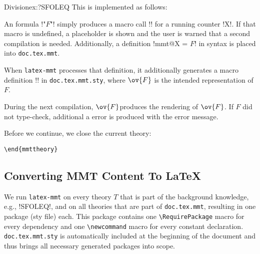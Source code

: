 \begin{mmttheory}{Division}{ex:?SFOLEQ}
\noindent
This is implemented as follows:
\begin{compactenum}
 \item An \mmt formula !"$F$"! simply produces a macro call !\mmt@X! for a running counter !X!.
 If that macro is undefined, a placeholder is shown and the user is warned that a second compilation is needed.
 Additionally, a definition !mmt@X = $F$! in \mmt syntax is placed into \texttt{doc.tex.mmt}.
 \item When \texttt{latex-mmt} processes that definition, it additionally generates a macro definition !\newcommand{\mmt@X}{$\ov{F}$}! in \texttt{doc.tex.mmt.sty}, where $\ov{F}$ is the intended \latex representation of $F$.
 \item During the next compilation, \mmt@X produces the rendering of $\ov{F}$.
 If $F$ did not type-check, additional a \latex error is produced with the error message.
\end{compactenum}

\noindent
Before we continue, we close the current theory:
\end{mmttheory}
\begin{lstlisting}
\end{mmttheory}
\end{lstlisting}




\subsection{Converting MMT Content To LaTeX}


We run \texttt{latex-mmt} on every theory $T$ that is part of the background knowledge, e.g., !SFOLEQ!, and on all theories that are part of \texttt{doc.tex.mmt}, resulting in one \latex package (sty file) each.
This package contains one \lstinline|\RequirePackage| macro for every dependency and one \lstinline|\newcommand| macro for every constant declaration.
\texttt{doc.tex.mmt.sty} is automatically included at the beginning of the document and thus brings all necessary generated \latex packages into scope.


